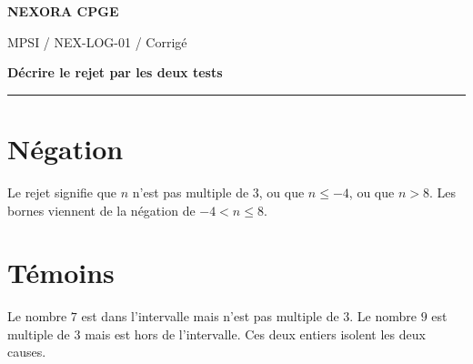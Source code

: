\documentclass[11pt,a4paper]{article}
\begin{document}
{\small\bfseries\color{nexorablue} NEXORA CPGE}\par
{\small MPSI / NEX-LOG-01 / Corrigé}\par
{\LARGE\bfseries Décrire le rejet par les deux tests}\par
\vspace{0.25em}\hrule\vspace{0.6em}

\section*{Négation}
Le rejet signifie que $n$ n’est pas multiple de $3$, ou que $n\le-4$, ou que $n>8$. Les bornes viennent de la négation de $-4<n\le8$.

\section*{Témoins}
Le nombre $7$ est dans l’intervalle mais n’est pas multiple de $3$. Le nombre $9$ est multiple de $3$ mais est hors de l’intervalle. Ces deux entiers isolent les deux causes.
\end{document}
